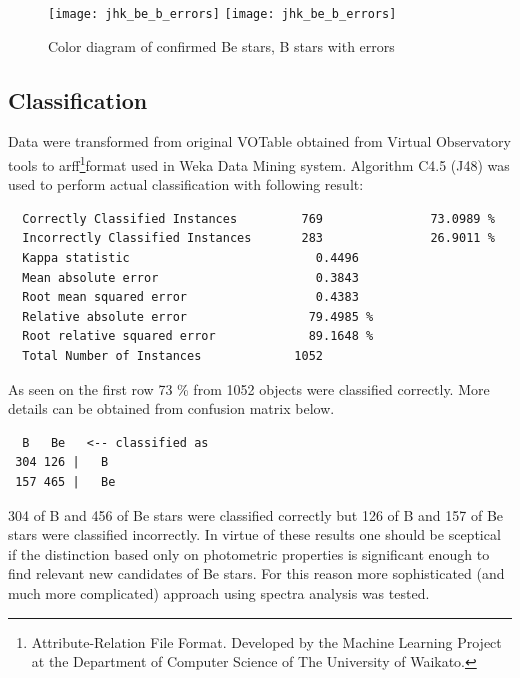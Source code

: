     \begin{figure}[!htbp]
      \begin{center}
        \leavevmode
        \ifpdf
        \texttt{[image: jhk\_be\_b\_errors]}
        \else
        \texttt{[image: jhk\_be\_b\_errors]}
        \fi
        \caption{Color diagram of confirmed Be stars, B stars with errors}
        \label{Figjhk_be_b_errors}
      \end{center}
    \end{figure}



\subsection{Classification}
Data were transformed from original VOTable obtained from Virtual
Observatory tools to arff\footnote{Attribute-Relation File
  Format. Developed by the Machine Learning Project at the Department
  of Computer Science of The University of Waikato.}format used in
Weka Data Mining system. Algorithm C4.5 (J48) was used to perform
actual classification with following result:

\begin{lstlisting}
  Correctly Classified Instances         769               73.0989 %
  Incorrectly Classified Instances       283               26.9011 %
  Kappa statistic                          0.4496
  Mean absolute error                      0.3843
  Root mean squared error                  0.4383
  Relative absolute error                 79.4985 %
  Root relative squared error             89.1648 %
  Total Number of Instances             1052
\end{lstlisting}

As seen on the first row 73 \% from  1052 objects were classified
correctly. More details can be obtained from confusion matrix below.

\begin{lstlisting}
  B   Be   <-- classified as
 304 126 |   B
 157 465 |   Be
\end{lstlisting}

304 of B and 456 of Be stars were classified correctly but 126 of B
and 157 of Be stars were classified incorrectly. In virtue of these
results one should be sceptical if the distinction based only on
photometric properties is significant enough to find relevant new
candidates of Be stars. For this reason more sophisticated (and much
more complicated) approach using spectra analysis was tested.

